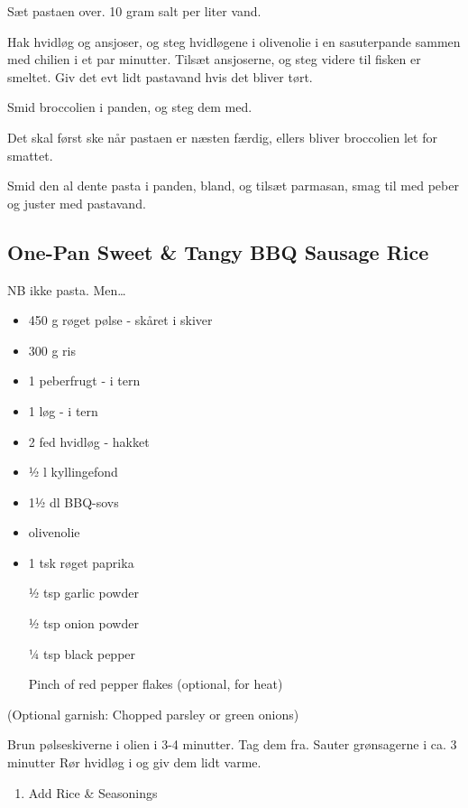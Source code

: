 \documentclass[
]{book}
\providecommand{\tightlist}{%
  \setlength{\itemsep}{0pt}\setlength{\parskip}{0pt}}
\begin{document}
Sæt pastaen over. 10 gram salt per liter vand.

Hak hvidløg og ansjoser, og steg hvidløgene i olivenolie i en sasuterpande sammen med chilien i et par minutter. Tilsæt ansjoserne, og steg videre til fisken er smeltet. Giv det evt lidt pastavand hvis det bliver tørt.

Smid broccolien i panden, og steg dem med.

Det skal først ske når pastaen er næsten færdig, ellers bliver broccolien let for smattet.

Smid den al dente pasta i panden, bland, og tilsæt parmasan, smag til med peber og juster med pastavand.

\hypertarget{one-pan-sweet-tangy-bbq-sausage-rice}{%
\subsection{One-Pan Sweet \& Tangy BBQ Sausage Rice}\label{one-pan-sweet-tangy-bbq-sausage-rice}}

NB ikke pasta. Men\ldots{}

\begin{itemize}
\item
  450 g røget pølse - skåret i skiver
\item
  300 g ris
\item
  1 peberfrugt - i tern
\item
  1 løg - i tern
\item
  2 fed hvidløg - hakket
\item
  ½ l kyllingefond
\item
  1½ dl BBQ-sovs
\item
  olivenolie
\item
  1 tsk røget paprika

  ½ tsp garlic powder

  ½ tsp onion powder

  ¼ tsp black pepper

  Pinch of red pepper flakes (optional, for heat)
\end{itemize}

(Optional garnish: Chopped parsley or green onions)

Brun pølseskiverne i olien i 3-4 minutter. Tag dem fra.
Sauter grønsagerne i ca. 3 minutter
Rør hvidløg i og giv dem lidt varme.

\begin{enumerate}
\def\labelenumi{\arabic{enumi}.}
\setcounter{enumi}{2}
\tightlist
\item
  Add Rice \& Seasonings
\end{enumerate}
\end{document}
